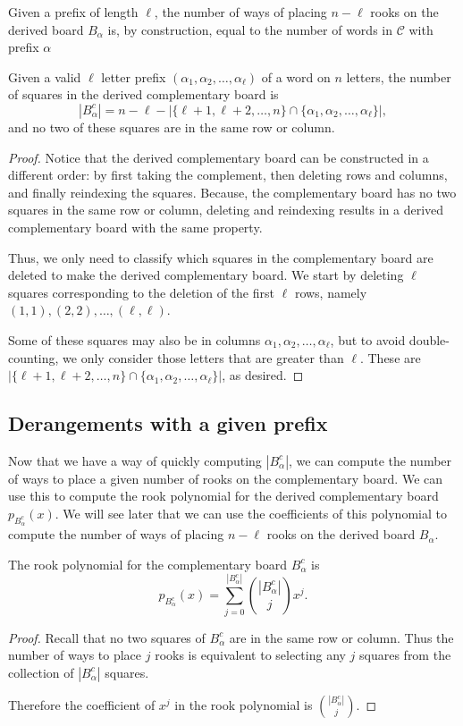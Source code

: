 Given a prefix of length $\ell$, the number of ways of placing $n - \ell$ rooks
on the derived board $B_\alpha$ is, by construction,
equal to the number of words in $\mathcal{C}$ with prefix $\alpha$
\begin{lemma}
  Given a valid $\ell$ letter prefix $(\alpha_1, \alpha_2, \dots, \alpha_\ell)$
  of a word on $n$ letters,
  the number of squares in the derived complementary board is \[
    |B_\alpha^c| = n - \ell - |\{\ell+1, \ell+2, \dots, n\} \cap \{\alpha_1, \alpha_2, \dots, \alpha_\ell\}|,
  \] and no two of these squares are in the same row or column.
  \label{lemma:derangementComplementSize}
\end{lemma}
\begin{proof}
  Notice that the derived complementary board can be constructed in a different
  order: by first taking the complement, then deleting rows and columns, and
  finally reindexing the squares.
  Because, the complementary board has no two squares in the same row or column,
  deleting and reindexing results in a derived complementary board with the same
  property.

  Thus, we only need to classify which squares in the complementary board are
  deleted to make the derived complementary board.
  We start by deleting $\ell$ squares corresponding to the deletion of the first
  $\ell$ rows, namely $(1, 1), (2, 2), \dots, (\ell, \ell)$.

  Some of these squares may also be in columns
  $\alpha_1, \alpha_2, \dots, \alpha_\ell$, but to avoid double-counting, we
  only consider those letters that are greater than $\ell$. These are
  $|\{\ell+1, \ell+2, \dots, n\} \cap \{\alpha_1, \alpha_2, \dots, \alpha_\ell\}|$,
  as desired.
\end{proof}

\subsection{Derangements with a given prefix}
Now that we have a way of quickly computing $|B_\alpha^c|$, we can compute the
number of ways to place a given number of rooks on the complementary board.
We can use this
to compute the rook polynomial for the derived complementary board
$p_{B_\alpha^c}(x)$.
We will see later that we can use the coefficients of this polynomial to compute
the number of ways of placing $n - \ell$ rooks on the derived board $B_\alpha$.

\begin{lemma}
  The rook polynomial for the complementary board $B_\alpha^c$ is \begin{equation}
    p_{B_\alpha^c}(x) = \sum_{j = 0}^{|B_\alpha^c|} \binom{|B_\alpha^c|}{j}x^j.
  \end{equation}
\end{lemma}
\begin{proof}
  Recall that no two squares of $B^c_\alpha$ are in the same row or column.
  Thus the number of ways to place $j$ rooks is equivalent to selecting any
  $j$ squares from the collection of $|B^c_\alpha|$ squares.

  Therefore the coefficient of $x^j$ in the rook polynomial is
  $\binom{|B_\alpha^c|}{j}$.
\end{proof}

